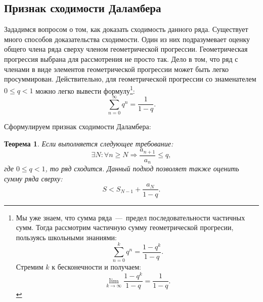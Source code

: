 \documentclass[12pt]{article}
\newtheorem{theorem}{Теорема}[section]
\begin{document}
\subsection{Признак сходимости Даламбера}
Зададимся вопросом о том, как доказать сходимость данного ряда. Существует много способов доказательства сходимости. Один из них подразумевает оценку общего члена ряда сверху членом геометрической прогрессии. Геометрическая прогрессия выбрана для рассмотрения не просто так. Дело в том, что ряд с членами в виде элементов геометрической прогрессии может быть легко просуммирован. Действительно, для геометрической прогрессии со знаменателем $0 \le q < 1$ можно легко вывести формулу\footnote{Мы уже знаем, что сумма ряда~\----~предел последовательности частичных сумм. Тогда рассмотрим частичную сумму геометрической прогресии, пользуясь школьными знаниями:
$$\sum_{n=0}^k q^n = \dfrac{1-q^k}{1-q}.$$
Стремим $k$ к бесконечности и получаем:
$$\lim_{k\rightarrow\infty} \dfrac{1-q^k}{1-q} = \dfrac{1}{1-q}.$$}:
\begin{equation}
    \sum\limits_{n=0}^\infty q^n = \dfrac{1}{1-q}.
\end{equation}
\par
Сформулируем признак сходимости Даламбера:
\begin{theorem}
    Если выполняется следующее требование:
    \begin{equation}
        \exists N: \forall n \ge N \Longrightarrow \dfrac{a_{n+1}}{a_{n}} \le q,
    \end{equation}
    где $0 \le q < 1$, то ряд сходится. Данный подход позволяет также оценить сумму ряда сверху:
    \begin{equation}
        S < S_{N-1} + \dfrac{a_N}{1-q}.
    \end{equation}
\end{theorem}
\end{document}
